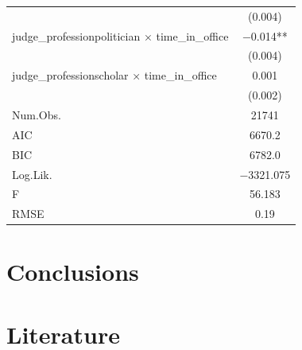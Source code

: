 \documentclass[
  11pt,
]{article}
\begin{document}
\begin{table}
\begin{tabular}[t]{lc}
 & \vphantom{1} (\num{0.004})\\
judge\_professionpolitician × time\_in\_office & \num{-0.014}**\\
 & (\num{0.004})\\
judge\_professionscholar × time\_in\_office & \num{0.001}\\
 & (\num{0.002})\\
\midrule
Num.Obs. & \num{21741}\\
AIC & \num{6670.2}\\
BIC & \num{6782.0}\\
Log.Lik. & \num{-3321.075}\\
F & \num{56.183}\\
RMSE & \num{0.19}\\
\bottomrule
\end{tabular}
\end{table}

\hypertarget{conclusions}{%
\section{Conclusions}\label{conclusions}}

\vspace{30pt}

\hypertarget{literature}{%
\section*{Literature}\label{literature}}
\end{document}
